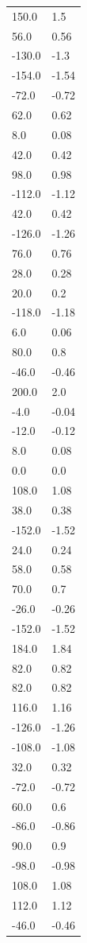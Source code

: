 \begin{longtable}{ll}
150.0 & 1.5 \\
56.0 & 0.56 \\
-130.0 & -1.3 \\
-154.0 & -1.54 \\
-72.0 & -0.72 \\
62.0 & 0.62 \\
8.0 & 0.08 \\
42.0 & 0.42 \\
98.0 & 0.98 \\
-112.0 & -1.12 \\
42.0 & 0.42 \\
-126.0 & -1.26 \\
76.0 & 0.76 \\
28.0 & 0.28 \\
20.0 & 0.2 \\
-118.0 & -1.18 \\
6.0 & 0.06 \\
80.0 & 0.8 \\
-46.0 & -0.46 \\
200.0 & 2.0 \\
-4.0 & -0.04 \\
-12.0 & -0.12 \\
8.0 & 0.08 \\
0.0 & 0.0 \\
108.0 & 1.08 \\
38.0 & 0.38 \\
-152.0 & -1.52 \\
24.0 & 0.24 \\
58.0 & 0.58 \\
70.0 & 0.7 \\
-26.0 & -0.26 \\
-152.0 & -1.52 \\
184.0 & 1.84 \\
82.0 & 0.82 \\
82.0 & 0.82 \\
116.0 & 1.16 \\
-126.0 & -1.26 \\
-108.0 & -1.08 \\
32.0 & 0.32 \\
-72.0 & -0.72 \\
60.0 & 0.6 \\
-86.0 & -0.86 \\
90.0 & 0.9 \\
-98.0 & -0.98 \\
108.0 & 1.08 \\
112.0 & 1.12 \\
-46.0 & -0.46 \\

\end{longtable}
